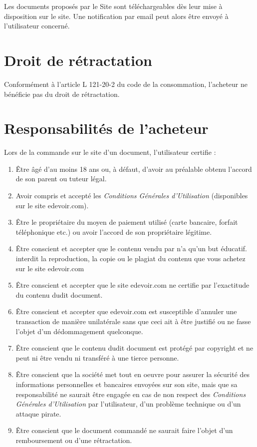 Les documents proposés par le Site sont téléchargeables dès leur mise à disposition sur le site. Une notification par email peut alors être envoyé à l'utilisateur concerné.

\section{Droit de rétractation}

Conformément à l'article L 121-20-2 du code de la consommation, l'acheteur ne bénéficie pas du droit de rétractation. 

\section{Responsabilités de l'acheteur}

Lors de la commande sur le site d'un document, l'utilisateur certifie :
\begin{enumerate}
   \item Être âgé d'au moins 18 ans ou, à défaut, d'avoir au préalable obtenu l'accord de son parent ou tuteur légal.
   \item Avoir compris et accepté les \textit{Conditions Générales d'Utilisation} (disponibles sur le site edevoir.com).
   \item Être le propriétaire du moyen de paiement utilisé (carte bancaire, forfait téléphonique etc.) ou avoir l'accord de son propriétaire légitime.
   \item Être conscient et accepter que le contenu vendu par \eDevoir n'a qu'un but éducatif. \eDevoir interdit la reproduction, la copie ou le plagiat du contenu que vous achetez sur le site edevoir.com
   \item Être conscient et accepter que le site edevoir.com ne certifie par l'exactitude du contenu dudit document.
   \item Être conscient et accepter que edevoir.com est susceptible d'annuler une transaction de manière unilatérale sans que ceci ait à être justifié ou ne fasse l'objet d'un dédommagement quelconque.
   \item Être conscient que le contenu dudit document est protégé par copyright et ne peut ni être vendu ni transféré à une tierce personne.
   \item Être conscient que la société \eDevoir met tout en oeuvre pour assurer la sécurité des informations personnelles et bancaires envoyées sur son site, mais que sa responsabilité ne saurait être engagée en cas de non respect des \textit{Conditions Générales d'Utilisation} par l'utilisateur, d'un problème technique ou d'un attaque pirate.
   \item Être conscient que le document commandé ne saurait faire l'objet d'un remboursement ou d'une rétractation.
\end{enumerate}
